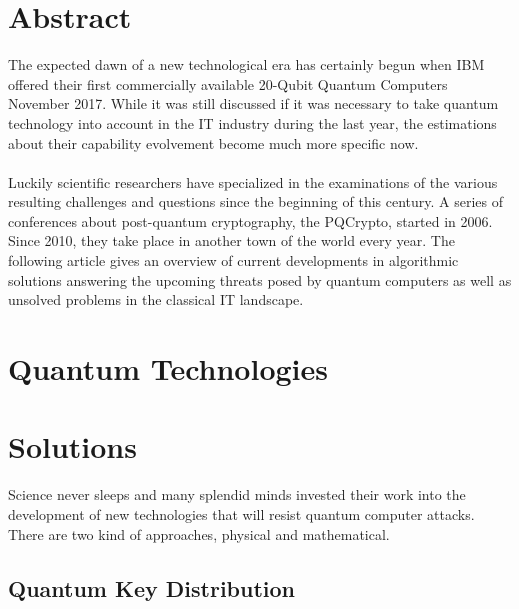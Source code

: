 \documentclass[a4paper,11pt]{article}
\begin{document}
\newpage
\setlength{\columnsep}{30pt}

\begin{multicols}{2}
 
\section{Abstract}

The expected dawn of a new technological era has certainly begun when IBM offered their first commercially available 20-Qubit Quantum Computers November 2017.
While it was still discussed if it was necessary to take quantum technology into account in the IT industry during the last year, the estimations about their capability evolvement become much more specific now.\\ \\
Luckily scientific researchers have specialized in the examinations of the various resulting challenges and questions since the beginning of this century. A series of conferences about post-quantum cryptography, the PQCrypto, started in 2006. Since 2010, they take place in another town of the world every year. The following article gives an overview of current developments in algorithmic solutions answering the upcoming threats posed by quantum computers as well as unsolved problems in the classical IT landscape. 
  

\section{Quantum Technologies}




\section{\Large{Solutions}}

Science never sleeps and many splendid minds invested their work into the development of new technologies that will resist quantum computer attacks. There are two kind of approaches, physical and mathematical.

\subsection{Quantum Key Distribution}


\end{multicols}
\end{document}
